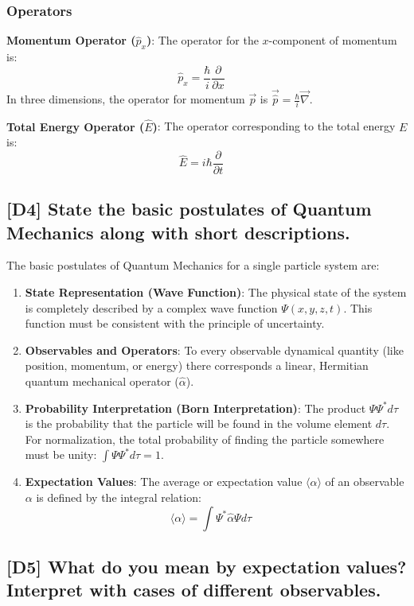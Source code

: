 \documentclass[12pt]{article}
\begin{document}
\subsubsection*{Operators}
\textbf{Momentum Operator ($\hat{p}_x$)}:
The operator for the $x$-component of momentum is:
$$
\hat{p}_x = \frac{\hbar}{i} \frac{\partial}{\partial x} \quad \text{}
$$
In three dimensions, the operator for momentum $\vec{p}$ is $\vec{\hat{p}} = \frac{\hbar}{i} \vec{\nabla}$.

\textbf{Total Energy Operator ($\hat{E}$)}:
The operator corresponding to the total energy $E$ is:
$$
\hat{E} = i\hbar \frac{\partial}{\partial t} \quad \text{}
$$

\subsection{[D4] State the basic postulates of Quantum Mechanics along with short descriptions.}

The basic postulates of Quantum Mechanics for a single particle system are:
\begin{enumerate}
    \item \textbf{State Representation (Wave Function)}: The physical state of the system is completely described by a complex wave function $\Psi(x, y, z, t)$. This function must be consistent with the principle of uncertainty.
    \item \textbf{Observables and Operators}: To every observable dynamical quantity (like position, momentum, or energy) there corresponds a linear, Hermitian quantum mechanical operator ($\hat{\alpha}$).
    \item \textbf{Probability Interpretation (Born Interpretation)}: The product $\Psi\Psi^* d\tau$ is the probability that the particle will be found in the volume element $d\tau$. For normalization, the total probability of finding the particle somewhere must be unity: $\int \Psi\Psi^* d\tau = 1$.
    \item \textbf{Expectation Values}: The average or expectation value $\langle \alpha \rangle$ of an observable $\alpha$ is defined by the integral relation:
    $$
    \langle \alpha \rangle = \int \Psi^* \hat{\alpha} \Psi d\tau \quad \text{}
    $$
\end{enumerate}

\subsection{[D5] What do you mean by expectation values? Interpret with cases of different observables.}
\end{document}
